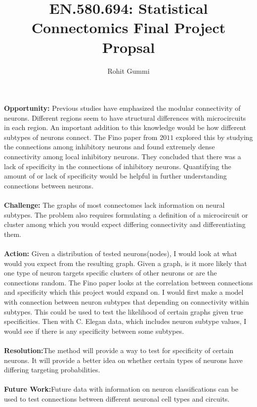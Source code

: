 \documentclass[12pt]{article}
\begin{document}
\title{EN.580.694: Statistical Connectomics Final Project Propsal}
\author{Rohit Gummi}
\maketitle
\subsection*{}
\textbf{Opportunity:} Previous studies have emphasized the modular connectivity of neurons. Different regions seem to have structural differences with microcircuits in each region. An important addition to this knowledge would be how different subtypes of neurons connect. The Fino paper from $2011$ explored this by studying the connections among inhibitory neurons and found extremely dense connectivity among local inhibitory neurons. They concluded that there was a lack of specificity in the connections of inhibitory neurons. Quantifying the amount of or lack of specificity would be helpful in further understanding connections between neurons.
\\\\\textbf{Challenge:} The graphs of most connectomes lack information on neural subtypes. The problem also requires formulating a definition of a microcircuit or cluster among which you would expect differing connectivity and differentiating them.
\\\\\textbf{Action:} Given a distribution of tested neurons(nodes), I would look at what would you expect from the resulting graph. Given a graph, is it more likely that one type of neuron targets specific clusters of other neurons or are the connections random. The Fino paper looks at the correlation between connections and specificity which this project would expand on. I would first make a model with connection between neuron subtypes that depending on connectivity within subtypes. This could be used to test the likelihood of certain graphs given true specificities. Then with C. Elegan data, which includes neuron subtype values, I would see if there is any specificity between some subtypes.
\\\\\textbf{Resolution:}The method will provide a way to test for specificity of certain neurons. It will provide a better idea on whether certain types of neurons have differing targeting probabilities.
\\\\\textbf{Future Work:}Future data with information on neuron classifications can be used to test connections between different neuronal cell types and circuits.
\end{document}
